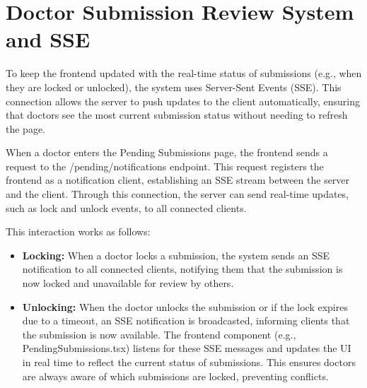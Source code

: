 \section{Doctor Submission Review System and SSE}\label{SSE_frontend}

To keep the frontend updated with the real-time status of submissions (e.g., when they are locked or unlocked), the system uses Server-Sent Events (SSE). This connection allows the server to push updates to the client automatically, ensuring that doctors see the most current submission status without needing to refresh the page.

When a doctor enters the Pending Submissions page, the frontend sends a request to the /pending/notifications endpoint. This request registers the frontend as a notification client, establishing an SSE stream between the server and the client. Through this connection, the server can send real-time updates, such as lock and unlock events, to all connected clients.

This interaction works as follows:
\begin{itemize}
	\item \textbf{Locking:} When a doctor locks a submission, the system sends an SSE notification to all connected clients, notifying them that the submission is now locked and unavailable for review by others.
	\item \textbf{Unlocking:} When the doctor unlocks the submission or if the lock expires due to a timeout, an SSE notification is broadcasted, informing clients that the submission is now available.
	The frontend component (e.g., PendingSubmissions.tsx) listens for these SSE messages and updates the UI in real time to reflect the current status of submissions. This ensures doctors are always aware of which submissions are locked, preventing conflicts.
\end{itemize}










